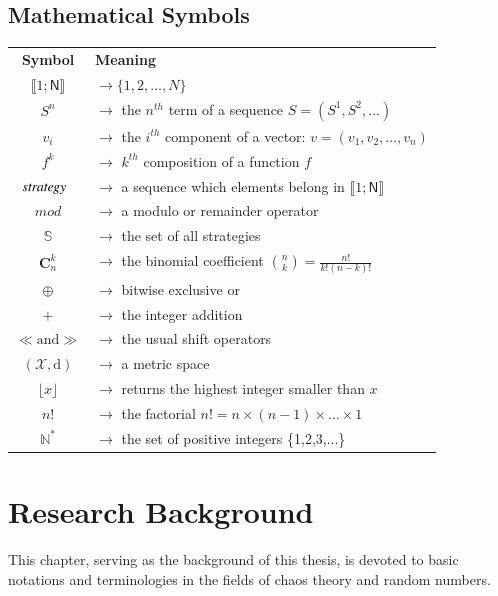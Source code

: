 \section{Mathematical Symbols}
\begin{tabular}{@{}c@{}@{}l@{}}
\textbf{Symbol} &\textbf{Meaning}\\
$\llbracket 1;\mathsf{N} \rrbracket$ & $\rightarrow\{1,2,\hdots,N\}$ \\
$S^{n}$ & $\rightarrow$ the $n^{th}$ term of a sequence $S=(S^{1},S^{2},\hdots)$ \\
$v_{i}$ & $\rightarrow$ the $i^{th}$ component of a vector: $v=(v_{1},v_{2},\hdots, v_n)$\\
$f^{k}$ & $\rightarrow$ $k^{th}$ composition of a function $f$ \\
$\emph{strategy}$~ & $\rightarrow$ a sequence which elements belong in $%
\llbracket 1;\mathsf{N} \rrbracket $ \\
$mod$ & $\rightarrow$ a modulo or remainder operator\\
$\mathbb{S}$ & $\rightarrow$ the set of all strategies \\
$\mathbf{C}_n^k$ & $\rightarrow$ the binomial coefficient ${n \choose k} = \frac{n!}{k!(n-k)!}$\\
$\oplus$ & $\rightarrow$ bitwise exclusive or \\
$+$ & $\rightarrow$ the integer addition \\
$\ll \text{and} \gg$ & $\rightarrow$ the usual shift operators \\
$(\mathcal{X}, \text{d})$ & $\rightarrow$ a metric space  \\
$\lfloor x \rfloor$ & $\rightarrow$ returns the highest integer smaller than $x$  \\
$n!$ & $\rightarrow$ the factorial $n!=n\times(n-1)\times\dots\times1$\\
$\mathds{N}^{\ast }$ & $\rightarrow$ the set of positive integers \{1,2,3,...\}
\end{tabular}





\chapter{Research Background}
\label{General Notions}
\minitoc
This chapter, serving as the background of this thesis,  
is devoted to basic notations and terminologies in the fields of chaos theory and random numbers.

